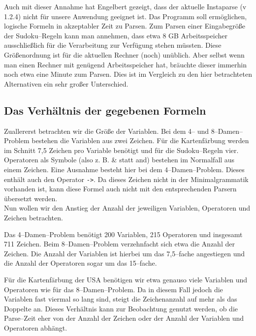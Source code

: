 \documentclass[ngerman,a4paper,abstracton,open=right,twoside=false,toc=listofnumbered,bibtotocnumbered]{scrreprt}
\begin{document}
Auch mit dieser Annahme hat Engelbert gezeigt, dass der aktuelle Instaparse (v 1.2.4) nicht für unsere Anwendung geeignet ist. Das Programm soll ermöglichen, logische Formeln in akzeptabler Zeit zu Parsen. Zum Parsen einer Eingabegröße der Sudoku--Regeln kann man annehmen, dass etwa 8 GB Arbeitsspeicher ausschließlich für die Verarbeitung zur Verfügung stehen müssten. Diese Größenordnung ist für die aktuellen Rechner (noch) unüblich. Aber selbst wenn man einen Rechner mit genügend Arbeitsspeicher hat, bräuchte dieser immerhin noch etwa eine Minute zum Parsen. Dies ist im Vergleich zu den hier betrachteten Alternativen ein sehr großer Unterschied.

\subsection{Das Verhältnis der gegebenen Formeln}

Zuallererst betrachten wir die Größe der Variablen. Bei dem 4-- und 8--Damen--Problem bestehen die Variablen aus zwei Zeichen. Für die Kartenfärbung werden im Schnitt 7,5 Zeichen pro Variable benötigt und für die Sudoku--Regeln vier.\\

Operatoren als Symbole (also z. B. \glqq{}\&\grqq{} statt \glqq{}and\grqq{}) bestehen im Normalfall aus einem Zeichen. Eine Ausnahme besteht hier bei dem 4--Damen--Problem. Dieses enthält auch den Operator \lstinline|->|. Da dieses Zeichen nicht in der Minimalgrammatik vorhanden ist, kann diese Formel auch nicht mit den entsprechenden Parsern übersetzt werden.\\

Nun wollen wir den Anstieg der Anzahl der jeweiligen Variablen, Operatoren und Zeichen betrachten.

Das 4--Damen--Problem benötigt 200 Variablen, 215 Operatoren und insgesamt 711 Zeichen. Beim 8--Damen--Problem verzehnfacht sich etwa die Anzahl der Zeichen. Die Anzahl der Variablen ist hierbei um das 7,5--fache angestiegen und die Anzahl der Operatoren sogar um das 15--fache.

Für die Kartenfärbung der USA benötigen wir etwa genauso viele Variablen und Operatoren wie für das 8--Damen--Problem. Da in diesem Fall jedoch die Variablen fast viermal so lang sind, steigt die Zeichenanzahl auf mehr als das Doppelte an. Dieses Verhältnis kann zur Beobachtung genutzt werden, ob die Parse--Zeit eher von der Anzahl der Zeichen oder der Anzahl der Variablen und Operatoren abhängt.
\end{document}
